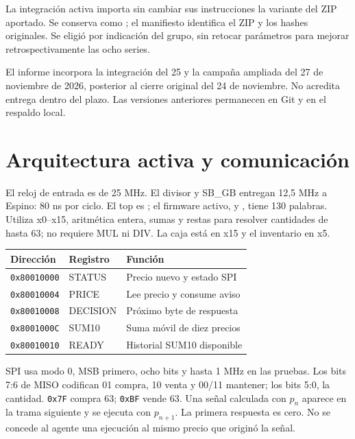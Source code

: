 \documentclass[11pt,a4paper]{article}
\begin{document}
La integración activa importa sin cambiar sus instrucciones la variante
 del ZIP aportado. Se conserva como
; el manifiesto 
identifica el ZIP y los hashes originales. Se eligió por indicación del grupo,
sin retocar parámetros para mejorar retrospectivamente las ocho series.

El informe incorpora la integración del 25 y la campaña ampliada del 27 de noviembre de 2026,
posterior al cierre original del 24 de noviembre. No acredita entrega dentro
del plazo. Las versiones anteriores permanecen en Git y en el respaldo local.

\section{Arquitectura activa y comunicación}
El reloj de entrada es de 25 MHz. El divisor y SB\_GB entregan 12,5 MHz a Espino:
80 ns por ciclo. El top es ; el firmware activo,
 y , tiene 130 palabras. Utiliza x0--x15,
aritmética entera, sumas y restas para resolver cantidades de hasta 63; no requiere
MUL ni DIV. La caja está en x15 y el inventario en x5.

\begin{center}\begin{tabular}{lll}\toprule
Dirección & Registro & Función \\\midrule
\texttt{0x80010000} & STATUS & Precio nuevo y estado SPI \\
\texttt{0x80010004} & PRICE & Lee precio y consume aviso \\
\texttt{0x80010008} & DECISION & Próximo byte de respuesta \\
\texttt{0x8001000C} & SUM10 & Suma móvil de diez precios \\
\texttt{0x80010010} & READY & Historial SUM10 disponible \\\bottomrule
\end{tabular}\end{center}
SPI usa modo 0, MSB primero, ocho bits y hasta 1 MHz en las pruebas. Los bits
7:6 de MISO codifican 01 compra, 10 venta y 00/11 mantener; los bits 5:0,
la cantidad. \texttt{0x7F} compra 63; \texttt{0xBF} vende 63.
Una señal calculada con $p_n$ aparece en la trama siguiente y se ejecuta con
$p_{n+1}$. La primera respuesta es cero. No se concede al agente una ejecución
al mismo precio que originó la señal.
\end{document}
